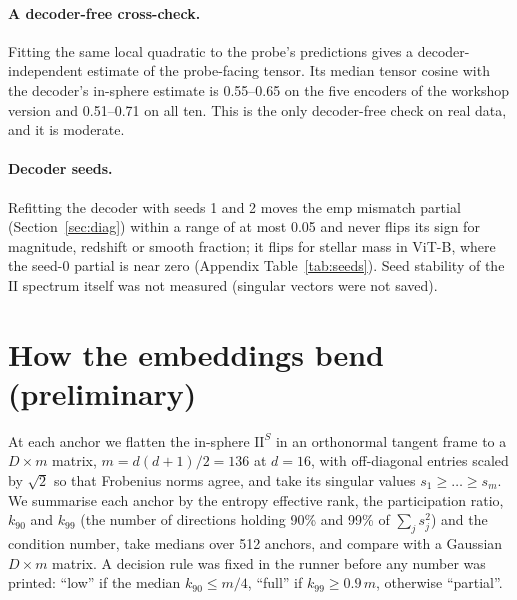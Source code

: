 \documentclass[10pt]{article}
\newcommand{\II}{\mathrm{II}}
\begin{document}
\paragraph{A decoder-free cross-check.} Fitting the same local quadratic to the probe's predictions gives a decoder-independent estimate of the probe-facing tensor. Its median tensor cosine with the decoder's in-sphere estimate is 0.55--0.65 on the five encoders of the workshop version and 0.51--0.71 on all ten. %
This is the only decoder-free check on real data, and it is moderate.

\paragraph{Decoder seeds.} Refitting the decoder with seeds 1 and 2 moves the emp mismatch partial (Section~\ref{sec:diag}) within a range of at most 0.05 and never flips its sign for magnitude, redshift or smooth fraction; it flips for stellar mass in ViT-B, where the seed-0 partial is near zero (Appendix Table~\ref{tab:seeds}). %
Seed stability of the $\II$ spectrum itself was not measured (singular vectors were not saved).

\section{How the embeddings bend (preliminary)}
\label{sec:bend}

At each anchor we flatten the in-sphere $\II^S$ in an orthonormal tangent frame to a $D\times m$ matrix, $m=d(d+1)/2=136$ at $d=16$, with off-diagonal entries scaled by $\sqrt2$ so that Frobenius norms agree, and take its singular values $s_1\ge\dots\ge s_m$. We summarise each anchor by the entropy effective rank, the participation ratio, $k_{90}$ and $k_{99}$ (the number of directions holding 90\% and 99\% of $\sum_j s_j^2$) and the condition number, take medians over 512 anchors, and compare with a Gaussian $D\times m$ matrix. A decision rule was fixed in the runner before any number was printed: ``low'' if the median $k_{90}\le m/4$, ``full'' if $k_{99}\ge0.9\,m$, otherwise ``partial''. %
\end{document}

